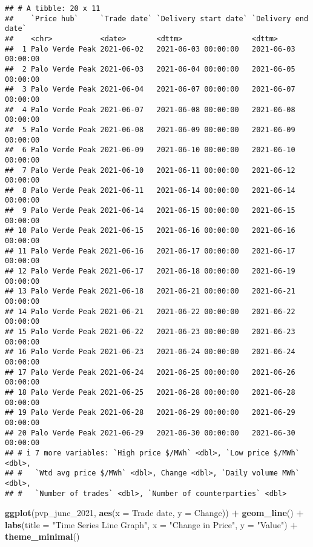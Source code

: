 \documentclass[
]{article}
\newenvironment{Shaded}{\begin{snugshade}}{\end{snugshade}}
\newcommand{\AttributeTok}[1]{\textcolor[rgb]{0.13,0.29,0.53}{#1}}
\newcommand{\FunctionTok}[1]{\textcolor[rgb]{0.13,0.29,0.53}{\textbf{#1}}}
\newcommand{\NormalTok}[1]{#1}
\newcommand{\SpecialCharTok}[1]{\textcolor[rgb]{0.81,0.36,0.00}{\textbf{#1}}}
\newcommand{\StringTok}[1]{\textcolor[rgb]{0.31,0.60,0.02}{#1}}
\begin{document}
\begin{verbatim}
## # A tibble: 20 x 11
##    `Price hub`     `Trade date` `Delivery start date` `Delivery end date`
##    <chr>           <date>       <dttm>                <dttm>             
##  1 Palo Verde Peak 2021-06-02   2021-06-03 00:00:00   2021-06-03 00:00:00
##  2 Palo Verde Peak 2021-06-03   2021-06-04 00:00:00   2021-06-05 00:00:00
##  3 Palo Verde Peak 2021-06-04   2021-06-07 00:00:00   2021-06-07 00:00:00
##  4 Palo Verde Peak 2021-06-07   2021-06-08 00:00:00   2021-06-08 00:00:00
##  5 Palo Verde Peak 2021-06-08   2021-06-09 00:00:00   2021-06-09 00:00:00
##  6 Palo Verde Peak 2021-06-09   2021-06-10 00:00:00   2021-06-10 00:00:00
##  7 Palo Verde Peak 2021-06-10   2021-06-11 00:00:00   2021-06-12 00:00:00
##  8 Palo Verde Peak 2021-06-11   2021-06-14 00:00:00   2021-06-14 00:00:00
##  9 Palo Verde Peak 2021-06-14   2021-06-15 00:00:00   2021-06-15 00:00:00
## 10 Palo Verde Peak 2021-06-15   2021-06-16 00:00:00   2021-06-16 00:00:00
## 11 Palo Verde Peak 2021-06-16   2021-06-17 00:00:00   2021-06-17 00:00:00
## 12 Palo Verde Peak 2021-06-17   2021-06-18 00:00:00   2021-06-19 00:00:00
## 13 Palo Verde Peak 2021-06-18   2021-06-21 00:00:00   2021-06-21 00:00:00
## 14 Palo Verde Peak 2021-06-21   2021-06-22 00:00:00   2021-06-22 00:00:00
## 15 Palo Verde Peak 2021-06-22   2021-06-23 00:00:00   2021-06-23 00:00:00
## 16 Palo Verde Peak 2021-06-23   2021-06-24 00:00:00   2021-06-24 00:00:00
## 17 Palo Verde Peak 2021-06-24   2021-06-25 00:00:00   2021-06-26 00:00:00
## 18 Palo Verde Peak 2021-06-25   2021-06-28 00:00:00   2021-06-28 00:00:00
## 19 Palo Verde Peak 2021-06-28   2021-06-29 00:00:00   2021-06-29 00:00:00
## 20 Palo Verde Peak 2021-06-29   2021-06-30 00:00:00   2021-06-30 00:00:00
## # i 7 more variables: `High price $/MWh` <dbl>, `Low price $/MWh` <dbl>,
## #   `Wtd avg price $/MWh` <dbl>, Change <dbl>, `Daily volume MWh` <dbl>,
## #   `Number of trades` <dbl>, `Number of counterparties` <dbl>
\end{verbatim}

\begin{Shaded}
\begin{Highlighting}[]
\FunctionTok{ggplot}\NormalTok{(pvp\_june\_2021, }\FunctionTok{aes}\NormalTok{(}\AttributeTok{x =} \StringTok{\textasciigrave{}}\AttributeTok{Trade date}\StringTok{\textasciigrave{}}\NormalTok{, }\AttributeTok{y =}\NormalTok{ Change)) }\SpecialCharTok{+}
  \FunctionTok{geom\_line}\NormalTok{() }\SpecialCharTok{+}
  \FunctionTok{labs}\NormalTok{(}\AttributeTok{title =} \StringTok{"Time Series Line Graph"}\NormalTok{,}
       \AttributeTok{x =} \StringTok{"Change in Price"}\NormalTok{,}
       \AttributeTok{y =} \StringTok{"Value"}\NormalTok{) }\SpecialCharTok{+}
  \FunctionTok{theme\_minimal}\NormalTok{()}
\end{Highlighting}
\end{Shaded}
\end{document}
